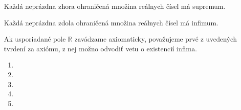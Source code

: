 \begin{veta}
Každá neprázdna zhora ohraničená množina reálnych čísel má supremum.
\end{veta}

\begin{veta}
Každá neprázdna zdola ohraničená množina reálnych čísel má infimum.
\end{veta}

Ak usporiadané pole $\mathbb{R}$ zavádzame axiomaticky, považujeme prvé z
uvedených tvrdení za axiómu, z nej možno odvodiť vetu o existencií infima.

\showanswers
\begin{enumerate}[resume]
\item {}
\hideanswers
\item {}
\item {}
\item {}
\item {}
\end{enumerate}
